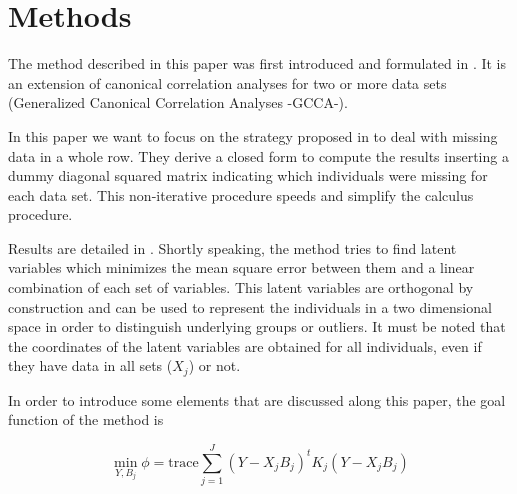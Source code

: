 \documentclass[article]{jss}
\begin{document}


\section{Methods} \label{sec:methods}

The method described in this paper was first introduced and formulated in \cite{Velden:2006}.
It is an extension of canonical correlation analyses for two or more data sets (Generalized Canonical Correlation Analyses -GCCA-).

In this paper we want to focus on the strategy proposed in \cite{Velden:2006} to deal with missing data in a whole row. They derive a closed form to compute the results inserting a dummy diagonal squared matrix indicating which individuals were missing for each data set. This non-iterative procedure speeds and simplify the calculus procedure.

Results are detailed in \cite{Velden:2006}. Shortly speaking, the method tries to find latent variables which minimizes the mean square error between them and a linear combination of each set of variables. This latent variables are orthogonal by construction and can be used to represent the individuals in a two dimensional space in order to distinguish underlying groups or outliers.
It must be noted that the coordinates of the latent variables are obtained for all individuals, even if they have data in all sets ($X_j$) or not.

In order to introduce some elements that are discussed along this paper, the goal function of the method is


\begin{equation} \label{eq:crit}
\min_{Y,B_j} \phi = \text{trace} \sum_{j=1}^J \left(Y - X_j B_j\right)^t K_j \left(Y-X_j B_j \right)
\end{equation}
\end{document}
